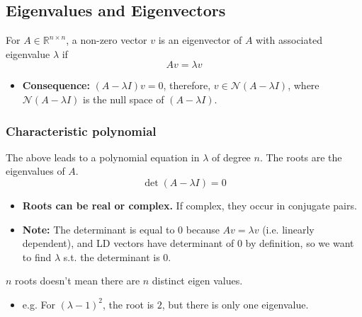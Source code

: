 \subsection{Eigenvalues and Eigenvectors}
\begin{definition}
    For $A \in \mathbb{R}^{n \times n}$, a non-zero vector $v$ is an eigenvector of $A$ with associated eigenvalue $\lambda$ if 
    \[
    A v = \lambda v
    \]
    \begin{itemize}
        \item \textbf{Consequence:} $(A - \lambda I) v = 0$, therefore, $v \in \mathcal{N}(A - \lambda I)$, where $\mathcal{N}(A - \lambda I)$ is the null space of $(A - \lambda I)$.    
    \end{itemize}
\end{definition}

\subsubsection{Characteristic polynomial}
\begin{definition} The above leads to a polynomial equation in $\lambda$ of degree $n$. The roots are the eigenvalues of $A$. 
    \[
    \det(A - \lambda I) = 0
    \]
    \begin{itemize}
        \item \textbf{Roots can be real or complex.} If complex, they occur in conjugate pairs.
        \item \textbf{Note:} The determinant is equal to 0 because $Av=\lambda v$ (i.e. linearly dependent), and LD vectors have determinant of $0$ by definition, so we want to find $\lambda$ s.t. the determinant is 0. 
    \end{itemize}
\end{definition}

\begin{warning}
    $n$ roots doesn't mean there are $n$ distinct eigen values. 
    \begin{itemize}
        \item e.g. For $(\lambda - 1)^2$, the root is $2$, but there is only one eigenvalue. 
    \end{itemize}
\end{warning}


